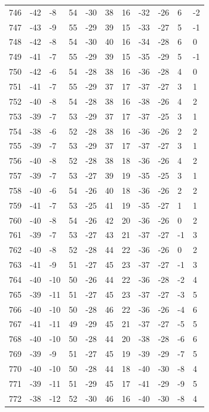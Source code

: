 \begin{table}[H]
\begin{tabular}{lllllllllll}
746 & -42 & -8 & 54 & -30 & 38 & 16 & -32 & -26 & 6 & -2 \\
747 & -43 & -9 & 55 & -29 & 39 & 15 & -33 & -27 & 5 & -1 \\
748 & -42 & -8 & 54 & -30 & 40 & 16 & -34 & -28 & 6 & 0 \\
749 & -41 & -7 & 55 & -29 & 39 & 15 & -35 & -29 & 5 & -1 \\
750 & -42 & -6 & 54 & -28 & 38 & 16 & -36 & -28 & 4 & 0 \\
751 & -41 & -7 & 55 & -29 & 37 & 17 & -37 & -27 & 3 & 1 \\
752 & -40 & -8 & 54 & -28 & 38 & 16 & -38 & -26 & 4 & 2 \\
753 & -39 & -7 & 53 & -29 & 37 & 17 & -37 & -25 & 3 & 1 \\
754 & -38 & -6 & 52 & -28 & 38 & 16 & -36 & -26 & 2 & 2 \\
755 & -39 & -7 & 53 & -29 & 37 & 17 & -37 & -27 & 3 & 1 \\
756 & -40 & -8 & 52 & -28 & 38 & 18 & -36 & -26 & 4 & 2 \\
757 & -39 & -7 & 53 & -27 & 39 & 19 & -35 & -25 & 3 & 1 \\
758 & -40 & -6 & 54 & -26 & 40 & 18 & -36 & -26 & 2 & 2 \\
759 & -41 & -7 & 53 & -25 & 41 & 19 & -35 & -27 & 1 & 1 \\
760 & -40 & -8 & 54 & -26 & 42 & 20 & -36 & -26 & 0 & 2 \\
761 & -39 & -7 & 53 & -27 & 43 & 21 & -37 & -27 & -1 & 3 \\
762 & -40 & -8 & 52 & -28 & 44 & 22 & -36 & -26 & 0 & 2 \\
763 & -41 & -9 & 51 & -27 & 45 & 23 & -37 & -27 & -1 & 3 \\
764 & -40 & -10 & 50 & -26 & 44 & 22 & -36 & -28 & -2 & 4 \\
765 & -39 & -11 & 51 & -27 & 45 & 23 & -37 & -27 & -3 & 5 \\
766 & -40 & -10 & 50 & -28 & 46 & 22 & -36 & -26 & -4 & 6 \\
767 & -41 & -11 & 49 & -29 & 45 & 21 & -37 & -27 & -5 & 5 \\
768 & -40 & -10 & 50 & -28 & 44 & 20 & -38 & -28 & -6 & 6 \\
769 & -39 & -9 & 51 & -27 & 45 & 19 & -39 & -29 & -7 & 5 \\
770 & -40 & -10 & 50 & -28 & 44 & 18 & -40 & -30 & -8 & 4 \\
771 & -39 & -11 & 51 & -29 & 45 & 17 & -41 & -29 & -9 & 5 \\
772 & -38 & -12 & 52 & -30 & 46 & 16 & -40 & -30 & -8 & 4 \\

\end{tabular}
\end{table}
